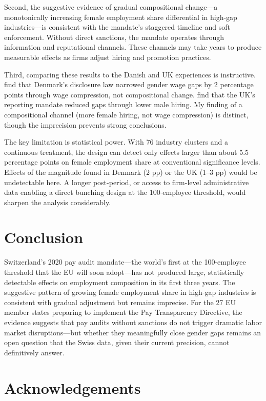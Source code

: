\documentclass[12pt]{article}
\begin{document}
Second, the suggestive evidence of gradual compositional change---a monotonically increasing female employment share differential in high-gap industries---is consistent with the mandate's staggered timeline and soft enforcement. Without direct sanctions, the mandate operates through information and reputational channels. These channels may take years to produce measurable effects as firms adjust hiring and promotion practices.

Third, comparing these results to the Danish and UK experiences is instructive. \citet{baker2023pay} find that Denmark's disclosure law narrowed gender wage gaps by 2 percentage points through wage compression, not compositional change. \citet{duchini2020pay} find that the UK's reporting mandate reduced gaps through lower male hiring. My finding of a compositional channel (more female hiring, not wage compression) is distinct, though the imprecision prevents strong conclusions.

The key limitation is statistical power. With 76 industry clusters and a continuous treatment, the design can detect only effects larger than about 5.5 percentage points on female employment share at conventional significance levels. Effects of the magnitude found in Denmark (2 pp) or the UK (1--3 pp) would be undetectable here. A longer post-period, or access to firm-level administrative data enabling a direct bunching design at the 100-employee threshold, would sharpen the analysis considerably.

\section{Conclusion}

Switzerland's 2020 pay audit mandate---the world's first at the 100-employee threshold that the EU will soon adopt---has not produced large, statistically detectable effects on employment composition in its first three years. The suggestive pattern of growing female employment share in high-gap industries is consistent with gradual adjustment but remains imprecise. For the 27 EU member states preparing to implement the Pay Transparency Directive, the evidence suggests that pay audits without sanctions do not trigger dramatic labor market disruptions---but whether they meaningfully close gender gaps remains an open question that the Swiss data, given their current precision, cannot definitively answer.

\section*{Acknowledgements}
\end{document}
